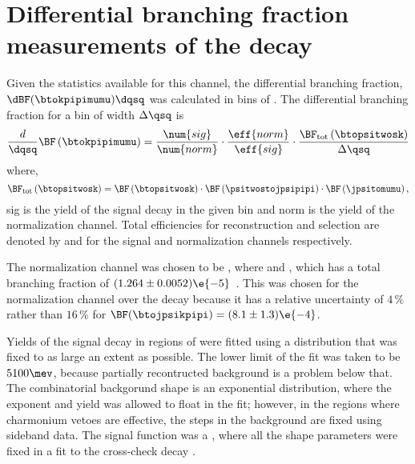 \section[Differential branching fraction measurements of the decay \btokpipimumu]{
  Differential branching fraction measurements of the decay \tmath{\btokpipimumu}
}

Given the statistics available for this channel, the differential branching fraction,
$\dBF(\btokpipimumu)\dqsq$ was calculated in bins of \qsq.
The differential branching fraction for a bin of width $\Delta\qsq$ is
\begin{equation}
  \frac{d}{\dqsq}\BF\left(\btokpipimumu\right)
  =
  \frac{\num{sig}}{\num{norm}} \cdot
  \frac{\eff{norm}}{\eff{sig}} \cdot
  \frac{\BF_\mathrm{tot}\left(\btopsitwosk\right)}{\Delta\qsq}
\end{equation}
where,
\begin{equation}
  \BF_\mathrm{tot}\left(\btopsitwosk\right)
  =
  \BF\left(\btopsitwosk\right) \cdot
  \BF\left(\psitwostojpsipipi\right) \cdot
  \BF\left(\jpsitomumu\right),
\end{equation}
\num{sig} is the yield of the signal decay \btokpipimumu in the given \qsq bin and \num{norm}
is the yield of the normalization channel.
Total efficiencies for reconstruction and selection are denoted by  and  for the
signal and normalization channels respectively.

The normalization channel was chosen to be \btopsitwosk, where \psitwostojpsipipi and \jpsitomumu,
which has a total branching fraction of $(1.264 \pm 0.0052)\e{-5}$~\cite{PDG2012}.
This was chosen for the normalization channel over the decay \btojpsikpipi because it has a relative
uncertainty of $4\,\%$ rather than $16\,\%$ for $\BF(\btojpsikpipi) = (8.1\pm1.3)\e{-4}$.

Yields of the signal decay in regions of \qsq were fitted using a distribution that was fixed to as
large an extent as possible.
The lower limit of the fit was taken to be $5100\mev$, because partially recontructed background
is a problem below that.
The combinatorial backgorund shape is an exponential distribution, where the exponent and yield was
allowed to float in the fit; however, in the regions where charmonium vetoes are effective, the
steps in the background are fixed using sideband data.
The signal function was a , where all the shape
parameters were fixed in a fit to the cross-check decay \btojpsikpipi.

